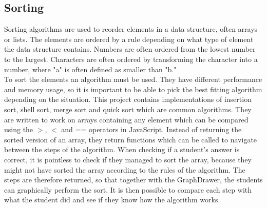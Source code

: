 \subsection{Sorting}
Sorting algorithms are used to reorder elements in a data structure, often arrays or lists. The elements are ordered by a rule depending on what type of element the data structure contains. Numbers are often ordered from the lowest number to the largest. Characters are often ordered by transforming the character into a number, where "a" is often defined as smaller than "b."
\\[11pt]
To sort the elements an algorithm must be used. They have different performance and memory usage, so it is important to be able to pick the best fitting algorithm depending on the situation. This project contains implementations of insertion sort, shell sort, merge sort and quick sort which are common algorithms. They are written to work on arrays containing any element which can be compared using the $>$, $<$ and == operators in JavaScript. Instead of returning the sorted version of an array, they return functions which can be called to navigate between the steps of the algorithm. When checking if a student's answer is correct, it is pointless to check if they managed to sort the array, because they might not have sorted the array according to the rules of the algorithm. The steps are therefore returned, so that together with the GraphDrawer, the students can graphically perform the sort. It is then possible to compare each step with what the student did and see if they know how the algorithm works.






